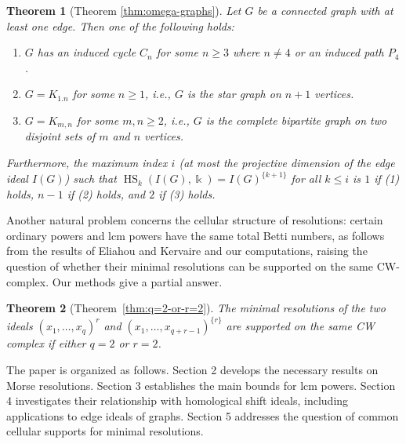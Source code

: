 \documentclass[reqno]{amsart}
\DeclareMathOperator{\pdim}{pdim}
\DeclareMathOperator{\HS}{HS}
\newtheorem{theorem}{Theorem}[section]
\theoremstyle{definition}
\theoremstyle{remark}
\numberwithin{equation}{section}
\begin{document}
\begin{theorem}[Theorem \ref{thm:omega-graphs}]
    Let $G$ be a connected graph with at least one edge. Then one of the following holds:
    \begin{enumerate}
        \item $G$ has an induced cycle $C_n$ for some $n\geq 3$ where $n\neq 4$ or an induced path $P_4$.
        \item $G=K_{1.n}$ for some $n\geq 1$, i.e., $G$ is the star graph on $n+1$ vertices.
        \item $G=K_{m,n}$ for some $m,n\geq 2$, i.e., $G$ is  the complete bipartite graph on two disjoint sets of $m$ and $n$ vertices.  
    \end{enumerate}
    Furthermore, the maximum index $i$ (at most the projective dimension of the edge ideal $I(G)$) such that $\HS_k(I(G),\Bbbk)=I(G)^{\{k+1\}}$ for all $k\leq i$  is $1$ if (1) holds, $n-1$ if (2) holds, and $2$ if (3) holds.


    
\end{theorem}



Another natural problem concerns the cellular structure of resolutions: certain ordinary powers and lcm powers have the same total Betti numbers, as follows from the results of Eliahou and Kervaire \cite{EliKer} and our computations, raising the question of whether their minimal resolutions can be supported on the same CW-complex. Our methods give a partial answer.

\begin{theorem}[Theorem~\ref{thm:q=2-or-r=2}]
    The minimal resolutions of the two ideals $(x_1,\dots, x_q)^r$ and $(x_1,\dots, x_{q+r-1})^{\{r\}}$ are supported on the same CW complex if either $q=2$ or $r=2$.
\end{theorem}

The paper is organized as follows. Section 2 develops the necessary results on Morse resolutions. Section 3 establishes the main bounds for lcm powers. Section 4 investigates their relationship with homological shift ideals, including applications to edge ideals of graphs. Section 5 addresses the question of common cellular supports for minimal resolutions.
\end{document}
